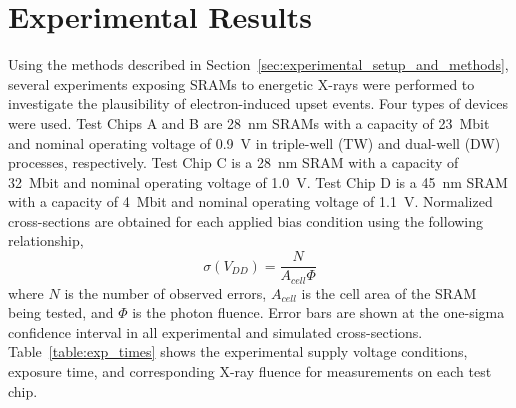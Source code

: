 \section{Experimental Results} %
\label{sec:experimental_results}
Using the methods described in Section~\ref{sec:experimental_setup_and_methods}, several experiments exposing SRAMs to energetic X-rays were performed to investigate the plausibility of electron-induced upset events. 
Four types of devices were used. 
Test Chips A and B are 28~nm SRAMs with a capacity of 23~Mbit and nominal operating voltage of 0.9~V in triple-well (TW) and dual-well (DW) processes, respectively. 
Test Chip C is a 28~nm SRAM with a capacity of 32~Mbit and nominal operating voltage of 1.0~V. 
Test Chip D is a 45~nm SRAM with a capacity of 4~Mbit and nominal operating voltage of 1.1~V. 
Normalized cross-sections are obtained for each applied bias condition using the following relationship,
\begin{equation}
    \label{eq:norm_cs}
    \sigma(V_{DD}) = \frac{N}{A_{cell} \Phi}
\end{equation}
where $N$ is the number of observed errors, $A_{cell}$ is the cell area of the SRAM being tested, and $\Phi$ is the photon fluence. 
Error bars are shown at the one-sigma confidence interval in all experimental and simulated cross-sections.
Table~\ref{table:exp_times} shows the experimental supply voltage conditions, exposure time, and corresponding X-ray fluence for measurements on each test chip.


